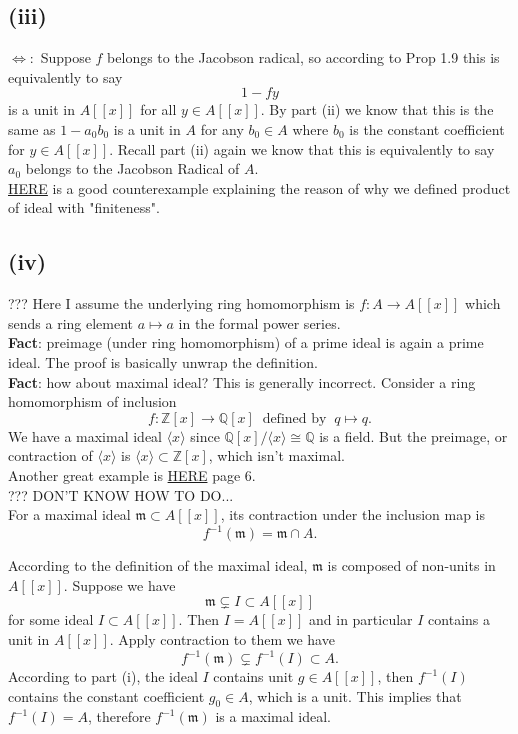\subsection{(iii)} 

$\Leftrightarrow:$ Suppose $f$ belongs to the Jacobson radical, so according to Prop 1.9 this is equivalently to say
$$1-fy$$ is a unit in $A[[x]]$ for all $y\in A[[x]]$. By part (ii) we know that this is the same as $1-a_0b_0$ is a unit in $A$ for any $b_0\in A$ where $b_0$ is the constant coefficient for $y\in A[[x]]$. Recall part (ii) again we know that this is equivalently to say $a_0$ belongs to the Jacobson Radical of $A$.\\

\href{https://math.stackexchange.com/questions/367073/about-the-definition-of-extended-ideals}{HERE} is a good counterexample explaining the reason of why we defined product of ideal with "finiteness".

\subsection{(iv)}

??? Here I assume the underlying ring homomorphism is $f:A\to A[[x]]$ which sends a ring element $a\mapsto a$ in the formal power series.\\

\textbf{Fact}: preimage (under ring homomorphism) of a prime ideal is again a prime ideal.
The proof is basically unwrap the definition.\\

\textbf{Fact}: how about maximal ideal? This is generally incorrect.
Consider a ring homomorphism of inclusion 
$$f:\mathbb Z[x]\to \mathbb Q[x] ~\text{  defined  by  }~ q\mapsto q.$$ 
We have a maximal ideal $\langle x\rangle$ since $\mathbb Q[x]/\langle x\rangle \cong \mathbb Q$ is a field. But the preimage, or contraction of $\langle x\rangle$ is $\langle x\rangle \subset \mathbb Z[x]$, which isn't maximal.\\
Another great example is \href{https://www.dpmms.cam.ac.uk/~sjw47/Lecture1-3.pdf}{HERE} page 6.\\

??? DON'T KNOW HOW TO DO...\\

For a maximal ideal $\mathfrak m\subset A[[x]]$, its contraction under the inclusion map is 
$$f^{-1}(\mathfrak m)=\mathfrak m\cap A.$$

According to the definition of the maximal ideal, $\mathfrak m$ is composed of non-units in $A[[x]]$. Suppose we have 
$$\mathfrak m\subsetneq I\subset  A[[x]]$$ for some ideal $I\subset A[[x]]$. Then $I=A[[x]]$ and in particular $I$ contains a unit in $A[[x]]$. Apply contraction to them we have 
$$f^{-1}(\mathfrak m)\subsetneq f^{-1}(I)\subset A.$$ According to part (i), the ideal $I$ contains unit $g\in A[[x]]$, then $f^{-1}(I)$ contains the constant coefficient $g_0\in A$, which is a unit. This implies that $f^{-1}(I)=A$, therefore $f^{-1}(\mathfrak m)$ is a maximal ideal. 

